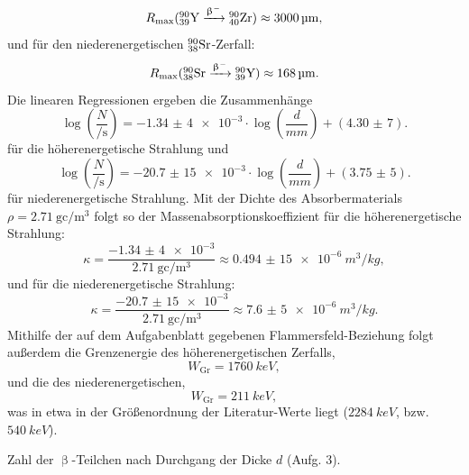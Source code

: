 \begin{equation}
R_\mathrm{max} (\element{Y}{39}{90} \xrightarrow{\upbeta^-} \element{Zr}{40}{90}) \approx \SI{3000}{\micro\meter},
\end{equation}
und für den niederenergetischen $\element{Sr}{38}{90}$-Zerfall:
\begin{equation}
R_\mathrm{max} (\element{Sr}{38}{90} \xrightarrow{\upbeta^-} \element{Y}{39}{90}) \approx \SI{168}{\micro\meter}.
\end{equation}
Die linearen Regressionen ergeben die Zusammenhänge
\begin{equation}
\log\left(\frac{N}{\si{\per\second}}\right) = \num{-1,34(4)e-3} \cdot \log\left(\frac{d}{\si{mm}}\right) + (\num{4,30(7)}).
\end{equation}
für die höherenergetische Strahlung und
\begin{equation}
\log\left(\frac{N}{\si{\per\second}}\right) = \num{-20,7(15)e-3} \cdot \log\left(\frac{d}{\si{mm}}\right) + (\num{3,75(5)}).
\end{equation}
für niederenergetische Strahlung. Mit der Dichte des Absorbermaterials $\rho=\SI{2,71}{\gram\centi\per\meter^3}$ folgt so der Massenabsorptionskoeffizient für die höherenergetische Strahlung:
\begin{equation}
\kappa = \frac{\num{-1,34(4)e-3}}{\SI{2,71}{\gram\centi\per\meter^3}} \approx \SI{0,494(15)e-6}{m^3/kg},
\end{equation}
und für die niederenergetische Strahlung:
\begin{equation}
\kappa = \frac{\num{-20,7(15)e-3}}{\SI{2,71}{\gram\centi\per\meter^3}} \approx \SI{7,6(5)e-6}{m^3/kg}.
\end{equation}
Mithilfe der auf dem Aufgabenblatt gegebenen Flammersfeld-Beziehung folgt außerdem die Grenzenergie des höherenergetischen Zerfalls,
\begin{equation}
W_\mathrm{Gr} = \SI{1760}{keV},
\end{equation}
und die des niederenergetischen,
\begin{equation}
W_\mathrm{Gr} = \SI{211}{keV},
\end{equation}
was in etwa in der Größenordnung der Literatur-Werte liegt ($\SI{2284}{keV}$, bzw. $\SI{540}{keV}$).

\begin{table}[tb]
	\centering
	\caption{Zahl der $\upbeta$-Teilchen nach Durchgang der Dicke $d$ (Aufg. 3).}
	\label{tab:iii_3}
	
	\vspace{8mm}
\end{table}

